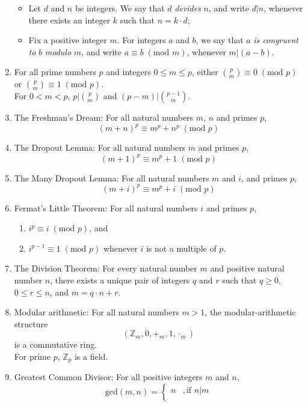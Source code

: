 \documentclass{article}
\begin{document}
\begin{enumerate}
\begin{itemize}[label={-},topsep=0pt]
            \item Let $d$ and $n$ be integers. We say that $d$ \textit{devides} $n$, and write $d|n$, whenever there exists an integer $k$ such that $n=k\cdot d$;
            \item Fix a positive integer $m$. For integers $a$ and $b$, we say that $a$ \textit{is congruent to} $b$ \textit{modulo} $m$, and write $a\equiv b\;(\text{mod } m)$, whenever $m|(a-b)$.
        \end{itemize}
    \item For all prime numbers $p$ and integers $0\leq m\leq p$, either $\binom{p}{m}\equiv 0\;(\text{mod } p)$ or $\binom{p}{m}\equiv 1\;(\text{mod } p)$.\\
        For $0<m<p$, $p|\binom{p}{m}$ and $(p-m)|\binom{p-1}{m}$.
    \item The Freshman's Dream: For all natural numbers $m$, $n$ and primes $p$, 
        $$(m+n)^p\equiv m^p+n^p\;(\text{mod } p)$$
    \item The Dropout Lemma: For all natural numbers $m$ and primes $p$, 
        $$(m+1)^p\equiv m^p+1\;(\text{mod } p)$$
    \item The Many Dropout Lemma: For all natural numbers $m$ and $i$, and primes $p$,
        $$(m+i)^p\equiv m^p+i\;(\text{mod } p)$$
    \item Fermat's Little Theorem: For all natural numbers $i$ and primes $p$, 
        \begin{enumerate}[label=(\arabic*),topsep=0pt]
            \item $i^p\equiv i\;(\text{mod } p)$, and
            \item $i^{p-1}\equiv 1\;(\text{mod } p)$ whenever $i$ is not a multiple of $p$.
        \end{enumerate}
    \item The Division Theorem: For every natural number $m$ and positive natural number $n$, there exists a unique pair of integers $q$ and $r$ such that $q\geq0$, $0\leq r\leq n$, and $m=q\cdot n+r$.
    \item Modular arithmetic: For all natural numbers $m>1$, the modular-arithmetic structure 
        $$(\mathbb{Z}_m,0,+_m,1,\cdot_m)$$
        is a commutative ring.\\
        For prime $p$, $\mathbb{Z}_p$ is a field.
    \item Greatest Common Divisor: For all positive integers $m$ and $n$,
        $$\text{gcd}(m,n)=\begin{cases}
            n &, \text{if }n|m\\

\end{cases}$$
\end{enumerate}
\end{document}
